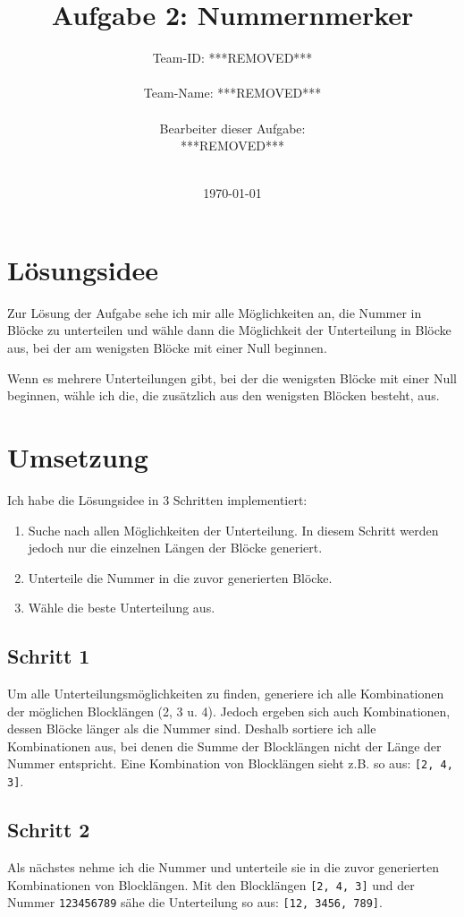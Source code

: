 \documentclass[a4paper,10pt]{scrartcl}
\title{Aufgabe 2: Nummernmerker}
\author{Team-ID: ***REMOVED*** \\\\
	    Team-Name: ***REMOVED*** \\\\
	    Bearbeiter dieser Aufgabe: \\
	    ***REMOVED***\\\\}
\date{\today}
\begin{document}
\maketitle
\tableofcontents

\section{Lösungsidee}
Zur Lösung der Aufgabe sehe ich mir alle Möglichkeiten an, die Nummer in Blöcke zu unterteilen und wähle dann die Möglichkeit der Unterteilung in Blöcke aus, bei der am wenigsten Blöcke mit einer Null beginnen.

Wenn es mehrere Unterteilungen gibt, bei der die wenigsten Blöcke mit einer Null beginnen, wähle ich die, die zusätzlich aus den wenigsten Blöcken besteht, aus.

\section{Umsetzung}
Ich habe die Lösungsidee in 3 Schritten implementiert:

\begin{enumerate}
	\item Suche nach allen Möglichkeiten der Unterteilung. In diesem Schritt werden jedoch nur die einzelnen Längen der Blöcke generiert.
	\item Unterteile die Nummer in die zuvor generierten Blöcke.
	\item Wähle die beste Unterteilung aus.
\end{enumerate}

\subsection{Schritt 1}
Um alle Unterteilungsmöglichkeiten zu finden, generiere ich alle Kombinationen der möglichen Blocklängen (2, 3 u. 4). Jedoch ergeben sich auch Kombinationen, dessen Blöcke länger als die Nummer sind. Deshalb sortiere ich alle Kombinationen aus, bei denen die Summe der Blocklängen nicht der Länge der Nummer entspricht. Eine Kombination von Blocklängen sieht z.B. so aus: \lstinline|[2, 4, 3]|.

\subsection{Schritt 2}
Als nächstes nehme ich die Nummer und unterteile sie in die zuvor generierten Kombinationen von Blocklängen. Mit den Blocklängen \lstinline|[2, 4, 3]| und der Nummer \lstinline|123456789| sähe die Unterteilung so aus: \lstinline|[12, 3456, 789]|.
\end{document}
